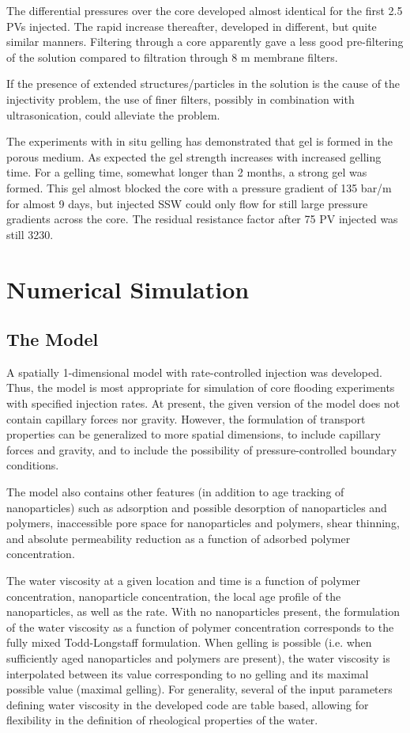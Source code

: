 \documentclass[journal = enfuem, manuscript =  article]{achemso}
\begin{document}
The differential pressures over the core developed almost identical for the first 2.5 PVs injected. The rapid increase thereafter, developed in different, but quite similar manners. Filtering through a core apparently gave a less good pre-filtering of the solution compared to filtration through 8 \micro m membrane filters.

If the presence of extended structures/particles in the solution is the cause of the injectivity problem, the use of finer filters, possibly in combination with ultrasonication, could alleviate the problem.

The experiments with in situ gelling has demonstrated that gel is formed in the porous medium. As expected the gel strength increases with increased gelling time. For a gelling time, somewhat longer than 2 months, a strong gel was formed. This gel almost blocked the core with a pressure gradient of 135 bar/m for almost 9 days, but injected SSW could only flow for still large pressure gradients across the core. The residual resistance factor after 75 PV injected was still 3230.



\section{Numerical Simulation}
\subsection{The Model}
A spatially 1-dimensional model with rate-controlled injection was developed. Thus, the model is most appropriate for simulation of core flooding experiments with specified injection rates. At present, the given version of the model does not contain capillary forces nor gravity. However, the formulation of transport properties can be generalized to more spatial dimensions, to include capillary forces and gravity, and to include the possibility of pressure-controlled boundary conditions. 

The model also contains other features (in addition to age tracking of nanoparticles) such as adsorption and possible desorption of nanoparticles and polymers, inaccessible pore space for nanoparticles and polymers, shear thinning, and absolute permeability reduction as a function of adsorbed polymer concentration. 

The water viscosity at a given location and time is a function of polymer concentration, nanoparticle concentration, the local age profile of the nanoparticles, as well as the rate. With no nanoparticles present, the formulation of the water viscosity as a function of polymer concentration corresponds to the fully mixed Todd-Longstaff formulation. When gelling is possible (i.e. when sufficiently aged nanoparticles and polymers are present), the water viscosity is interpolated between its value corresponding to no gelling and its maximal possible value (maximal gelling).  For generality, several of the input parameters defining water viscosity in the developed code are table based, allowing for flexibility in the definition of rheological properties of the water.
\end{document}
